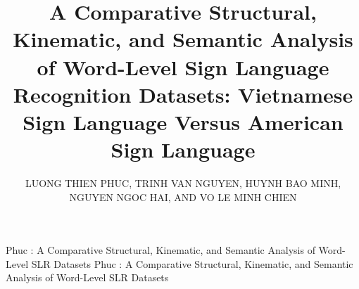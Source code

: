 \documentclass{ieeeaccess}
\begin{document}
\raggedbottom


\title{A Comparative Structural, Kinematic, and Semantic Analysis of Word-Level Sign Language Recognition Datasets: Vietnamese Sign Language Versus American Sign Language}

\author{\uppercase{Luong Thien Phuc}, 
\uppercase{Trinh Van Nguyen}, 
\uppercase{Huynh Bao Minh}, 
\uppercase{Nguyen Ngoc Hai}, AND 
\uppercase{Vo Le Minh Chien}}

\address{HCMC University of Technology and Education, Faculty of IT, Ho Chi Minh City 700000, Vietnam}

\markboth
{Phuc \headeretal: A Comparative Structural, Kinematic, and Semantic Analysis of Word-Level SLR Datasets}
{Phuc \headeretal: A Comparative Structural, Kinematic, and Semantic Analysis of Word-Level SLR Datasets}


\end{document}
